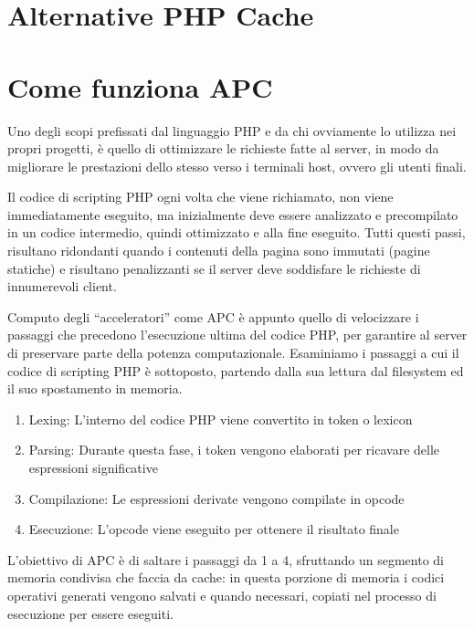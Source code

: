 \section{Alternative PHP Cache}
\label{def:apc}

\section*{Come funziona APC}
Uno degli scopi prefissati dal linguaggio PHP e da chi ovviamente lo utilizza nei propri progetti, è quello di ottimizzare le richieste fatte al server, in modo da migliorare le prestazioni dello stesso verso i terminali host, ovvero gli utenti finali.

Il codice di scripting PHP ogni volta che viene richiamato, non viene immediatamente eseguito, ma inizialmente deve essere analizzato e precompilato in un codice intermedio, quindi ottimizzato e alla fine eseguito. Tutti questi passi, risultano ridondanti quando i contenuti della pagina sono immutati (pagine statiche) e risultano penalizzanti se il server deve soddisfare le richieste di innumerevoli client.

Computo degli ``acceleratori'' come APC è appunto quello di velocizzare i passaggi che precedono l'esecuzione ultima del codice PHP, per garantire al server di preservare parte della potenza computazionale. Esaminiamo i passaggi a cui il codice di scripting PHP è sottoposto, partendo dalla sua lettura dal filesystem ed il suo spostamento in memoria.

\begin{enumerate}
\item Lexing: L'interno del codice PHP viene convertito in token o lexicon
\item Parsing: Durante questa fase, i token vengono elaborati per ricavare delle espressioni significative
\item Compilazione: Le espressioni derivate vengono compilate in opcode
\item Esecuzione: L'opcode viene eseguito per ottenere il risultato finale
\end{enumerate}

L'obiettivo di APC è di saltare i passaggi da 1 a 4, sfruttando un segmento di memoria condivisa che faccia da cache: in questa porzione di memoria i codici operativi generati vengono salvati e quando necessari, copiati nel processo di esecuzione per essere eseguiti.

